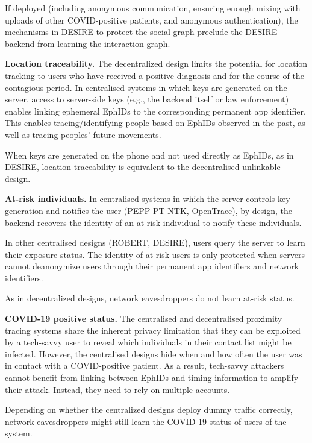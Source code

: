 \documentclass{article}
\begin{document}
If deployed (including anonymous communication, ensuring enough mixing
with uploads of other COVID-positive patients, and anonymous
authentication), the mechanisms in DESIRE to protect the social graph
preclude the DESIRE backend from learning the interaction graph.

\textbf{Location traceability.} The decentralized design limits the
potential for location tracking to users who have received a positive
diagnosis and for the course of the contagious period. In centralised
systems in which keys are generated on the server, access to server-side
keys (e.g., the backend itself or law enforcement) enables linking
ephemeral EphIDs to the corresponding permanent app identifier. This
enables tracing/identifying people based on EphIDs observed in the past,
as well as tracing peoples' future movements.

When keys are generated on the phone and not used directly as EphIDs, as
in DESIRE, location traceability is equivalent to the
\protect\hyperlink{unlinkable-decentralized-proximity-tracing}{{decentralised
unlinkable design}}.

\textbf{At-risk individuals.} In centralised systems in which the server
controls key generation and notifies the user (PEPP-PT-NTK, OpenTrace),
by design, the backend recovers the identity of an at-risk individual to
notify these individuals.

In other centralised designs (ROBERT, DESIRE), users query the server to
learn their exposure status. The identity of at-risk users is only
protected when servers cannot deanonymize users through their permanent
app identifiers and network identifiers.

As in decentralized designs, network eavesdroppers do not learn at-risk
status.

\textbf{COVID-19 positive status.} The centralised and decentralised
proximity tracing systems share the inherent privacy limitation that
they can be exploited by a tech-savvy user to reveal which individuals
in their contact list might be infected. However, the centralised
designs hide when and how often the user was in contact with a
COVID-positive patient. As a result, tech-savvy attackers cannot benefit
from linking between EphIDs and timing information to amplify their
attack. Instead, they need to rely on multiple accounts.

Depending on whether the centralized designs deploy dummy traffic
correctly, network eavesdroppers might still learn the COVID-19 status
of users of the system.
\end{document}
